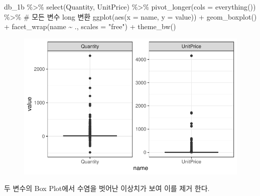 \documentclass[
  letterpaper,
  DIV=11,
  numbers=noendperiod]{scrreprt}
\newenvironment{Shaded}{\begin{snugshade}}{\end{snugshade}}
\newcommand{\AttributeTok}[1]{\textcolor[rgb]{0.40,0.45,0.13}{#1}}
\newcommand{\CommentTok}[1]{\textcolor[rgb]{0.37,0.37,0.37}{#1}}
\newcommand{\FunctionTok}[1]{\textcolor[rgb]{0.28,0.35,0.67}{#1}}
\newcommand{\NormalTok}[1]{\textcolor[rgb]{0.00,0.23,0.31}{#1}}
\newcommand{\SpecialCharTok}[1]{\textcolor[rgb]{0.37,0.37,0.37}{#1}}
\newcommand{\StringTok}[1]{\textcolor[rgb]{0.13,0.47,0.30}{#1}}
\begin{document}
\begin{Shaded}
\begin{Highlighting}[]
\NormalTok{db\_1b }\SpecialCharTok{\%\textgreater{}\%} \FunctionTok{select}\NormalTok{(Quantity, UnitPrice) }\SpecialCharTok{\%\textgreater{}\%}
  \FunctionTok{pivot\_longer}\NormalTok{(}\AttributeTok{cols =} \FunctionTok{everything}\NormalTok{()) }\SpecialCharTok{\%\textgreater{}\%} \CommentTok{\# 모든 변수 long 변환}
  \FunctionTok{ggplot}\NormalTok{(}\FunctionTok{aes}\NormalTok{(}\AttributeTok{x =}\NormalTok{ name, }\AttributeTok{y =}\NormalTok{ value)) }\SpecialCharTok{+}
  \FunctionTok{geom\_boxplot}\NormalTok{() }\SpecialCharTok{+} \FunctionTok{facet\_wrap}\NormalTok{(name }\SpecialCharTok{\textasciitilde{}}\NormalTok{ ., }\AttributeTok{scales =} \StringTok{"free"}\NormalTok{) }\SpecialCharTok{+}
  \FunctionTok{theme\_bw}\NormalTok{()}
\end{Highlighting}
\end{Shaded}

\begin{figure}[H]

{\centering \includegraphics{./test_26_files/figure-pdf/unnamed-chunk-5-1.pdf}

}

\end{figure}

두 변수의 Box Plot에서 수염을 벗어난 이상치가 보여 이를 제거 한다.
\end{document}

